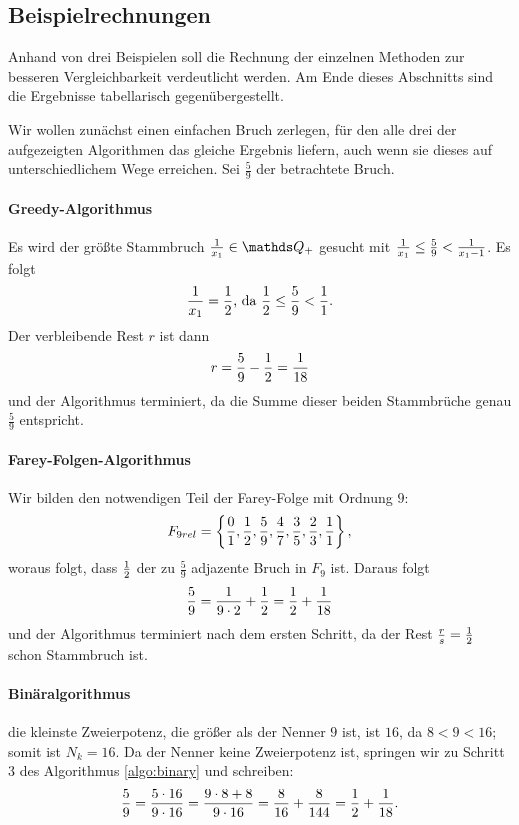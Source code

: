 \subsection{Beispielrechnungen}

Anhand von drei Beispielen soll die Rechnung der einzelnen Methoden zur besseren Vergleichbarkeit verdeutlicht werden. Am Ende dieses Abschnitts sind die Ergebnisse tabellarisch gegenübergestellt.

\begin{bsp}
	Wir wollen zunächst einen einfachen Bruch zerlegen, für den alle drei der aufgezeigten Algorithmen das gleiche Ergebnis liefern, auch wenn sie dieses auf unterschiedlichem Wege erreichen.
	Sei $\frac{5}{9}$ der betrachtete Bruch.
	\paragraph{Greedy-Algorithmus} Es wird der größte Stammbruch $\uf{x_1} \in \Q_+$ gesucht mit $\frac{1}{x_1} \leq \frac{5}{9} < \frac{1}{x_1-1}$. Es folgt $$\frac{1}{x_1} = \frac{1}{2} \text{, da }
	\frac{1}{2} \leq \frac{5}{9} < \frac{1}{1}.$$
	Der verbleibende Rest $r$ ist dann $$r = \frac{5}{9} - \frac{1}{2} = \frac{1}{18}$$
	und der Algorithmus terminiert, da die Summe dieser beiden Stammbrüche genau $\frac{5}{9}$ entspricht.
	
	\paragraph{Farey-Folgen-Algorithmus}Wir bilden den notwendigen Teil der Farey-Folge mit Ordnung $9$: $$F_{9rel} = \left\{ \frac{0}{1}, \frac{1}{2}, \frac{5}{9}, \frac{4}{7}, \frac{3}{5}, \frac{2}{3}, \frac{1}{1}\right\},$$ woraus folgt, dass $\frac{1}{2}$ der zu $\frac{5}{9}$ adjazente Bruch in $F_9$ ist. Daraus folgt 
	$$\frac{5}{9} = \frac{1}{9 \cdot 2} + \frac{1}{2} = \frac{1}{2} + \frac{1}{18}$$ und der Algorithmus terminiert nach dem ersten Schritt, da der Rest $\frac{r}{s} = \frac{1}{2}$ schon Stammbruch ist.
	
	\paragraph{Binäralgorithmus}die kleinste Zweierpotenz, die größer als der Nenner $9$ ist, ist $16$, da $8<9<16$; somit ist $N_k = 16$. Da der Nenner keine Zweierpotenz ist, springen wir zu Schritt 3 des Algorithmus \ref{algo:binary} und schreiben:
	$$\frac{5}{9} = \frac{5\cdot16}{9 \cdot 16} = \frac{9 \cdot 8 + 8}{9 \cdot 16} = \frac{8}{16} + \frac{8}{144} = \frac{1}{2} + \frac{1}{18}.$$
	

\end{bsp}

